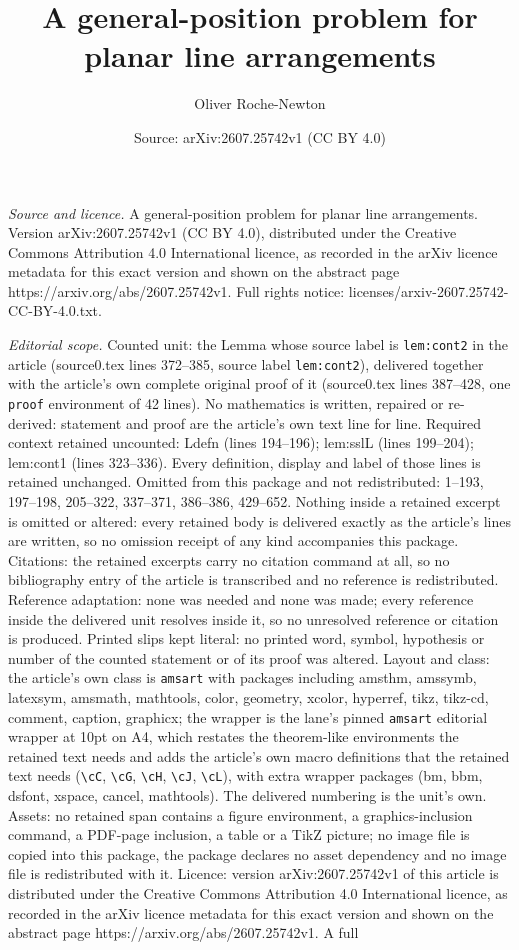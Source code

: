\documentclass[10pt,a4paper]{amsart}
\title[A general-position problem for planar line arrangements]{A general-position problem for planar line arrangements}
\author{Oliver Roche-Newton}
\date{Source: arXiv:2607.25742v1 (CC BY 4.0)}
\begin{document}
\maketitle

\noindent\emph{Source and licence.} A general-position problem for planar line arrangements. Version arXiv:2607.25742v1 (CC BY 4.0), distributed under the Creative Commons Attribution 4.0 International licence, as recorded in the arXiv licence metadata for this exact version and shown on the abstract page https://arxiv.org/abs/2607.25742v1. Full rights notice: licenses/arxiv-2607.25742-CC-BY-4.0.txt.\par\smallskip

\noindent\textit{Editorial scope.} Counted unit: the Lemma whose source label is \texttt{lem:cont2} in the article (source0.tex lines 372--385, source label \texttt{lem:cont2}), delivered together with the article's own complete original proof of it (source0.tex lines 387--428, one \texttt{proof} environment of 42 lines). No mathematics is written, repaired or re-derived: statement and proof are the article's own text line for line. Required context retained uncounted: Ldefn (lines 194--196); lem:sslL (lines 199--204); lem:cont1 (lines 323--336). Every definition, display and label of those lines is retained unchanged. Omitted from this package and not redistributed: 1--193, 197--198, 205--322, 337--371, 386--386, 429--652. Nothing inside a retained excerpt is omitted or altered: every retained body is delivered exactly as the article's lines are written, so no omission receipt of any kind accompanies this package. Citations: the retained excerpts carry no citation command at all, so no bibliography entry of the article is transcribed and no reference is redistributed. Reference adaptation: none was needed and none was made; every reference inside the delivered unit resolves inside it, so no unresolved reference or citation is produced. Printed slips kept literal: no printed word, symbol, hypothesis or number of the counted statement or of its proof was altered. Layout and class: the article's own class is \texttt{amsart} with packages including amsthm, amssymb, latexsym, amsmath, mathtools, color, geometry, xcolor, hyperref, tikz, tikz-cd, comment, caption, graphicx; the wrapper is the lane's pinned \texttt{amsart} editorial wrapper at 10pt on A4, which restates the theorem-like environments the retained text needs and adds the article's own macro definitions that the retained text needs (\texttt{\textbackslash cC}, \texttt{\textbackslash cG}, \texttt{\textbackslash cH}, \texttt{\textbackslash cJ}, \texttt{\textbackslash cL}), with extra wrapper packages (bm, bbm, dsfont, xspace, cancel, mathtools). The delivered numbering is the unit's own. Assets: no retained span contains a figure environment, a graphics-inclusion command, a PDF-page inclusion, a table or a TikZ picture; no image file is copied into this package, the package declares no asset dependency and no image file is redistributed with it. Licence: version arXiv:2607.25742v1 of this article is distributed under the Creative Commons Attribution 4.0 International licence, as recorded in the arXiv licence metadata for this exact version and shown on the abstract page https://arxiv.org/abs/2607.25742v1. A full 
\end{document}
